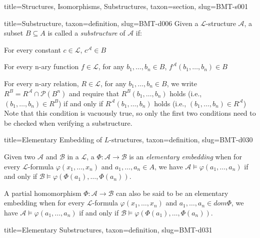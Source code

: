 \documentclass[a4paper]{article}
\begin{document}
\begin{tree}{title={Structures, Isomorphisms, Substructures}, taxon={section}, slug={BMT-s001}}
\begin{tree}{title={Substructure}, taxon={definition}, slug={BMT-d006}}
Given a \(\mathcal {L}\)-structure \(\mathcal {A}\), a subset \(B  \subseteq  A\) is called a \emph{substructure} of \(\mathcal {A}\) if:\par{For every constant \(c \in   \mathcal {L}\), \(c^{ \mathcal {A}}  \in  B\)}\par{For every n-ary function \(f \in   \mathcal {L}\), for any \(b_1, \dots , b_n  \in  B\), \(f^{ \mathcal {A}}(b_1, \dots ,b_n)  \in  B\)}\par{For every n-ary relation, \(R \in   \mathcal {L}\), for any \(b_1, \dots , b_n  \in  B\), we write \(R^B = R^{ \mathcal {A}} \cap   \mathcal {P}(B^n)\) and require that
\(R^{B}(b_1, \dots , b_n)\) holds (i.e., \((b_1, \dots , b_n)  \in  R^{B}\))  if and only if \(R^{ \mathcal {A}}(b_1, \dots , b_n)\) holds (i.e., \((b_1, \dots , b_n)  \in  R^{ \mathcal {A}}\)) 
Note that this condition is vacuously true, so only the first two conditions need to be checked when verifying a substructure.}
\end{tree}

\begin{tree}{title={Elementary Embedding of \(L\)-structures}, taxon={definition}, slug={BMT-d030}}

    Given two  \(\mathcal {A}\) and \(\mathcal {B}\) in a  \(\mathcal {L}\),
    a  \(\Phi \colon \mathcal {A}  \to   \mathcal {B}\) is an \emph{elementary embedding} when
    for every \(\mathcal  L\)-formula \(\varphi (x_1, \dots ,x_n)\) and \(a_1, \dots ,a_n \in  A\),
    we have \(\mathcal  A \vDash \varphi (a_1, \dots ,a_n)\) if and only if \(\mathcal  B \vDash \varphi ( \Phi (a_1), \dots , \Phi (a_n))\).

    A partial homomorphism \(\Phi : \mathcal {A} \to \mathcal {B}\) can also be said to be an elementary embedding when
    for every \(\mathcal  L\)-formula \(\varphi (x_1, \dots ,x_n)\) and \(a_1, \dots ,a_n \in  dom \Phi\),
    we have \(\mathcal  A \vDash \varphi (a_1, \dots ,a_n)\) if and only if \(\mathcal  B \vDash \varphi ( \Phi (a_1), \dots , \Phi (a_n))\).



\end{tree}

\begin{tree}{title={Elementary Substructures}, taxon={definition}, slug={BMT-d031}}


\end{tree}
\end{tree}
\end{document}
